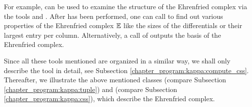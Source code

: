 For example,  can be used to examine the structure of the Ehrenfried complex via the tools
 and .
After  has been performed, one can call 
to find out various properties of the Ehrenfried complex $\mathbb E$
like the sizes of the differentials or their largest entry per column.
Alternatively, a call of  outputs the basis of the Ehrenfried complex.

Since all these tools mentioned are organized in a similar way, 
we shall only describe the tool  in detail, see Subsection \ref{chapter_program:kappa:compute_css}.
Thereafter, we illustrate the above mentioned classes  (compare Subsection \ref{chapter_program:kappa:tuple}) and  (compare Subsection \ref{chapter_program:kappa:css}),
which describe the Ehrenfried complex.





